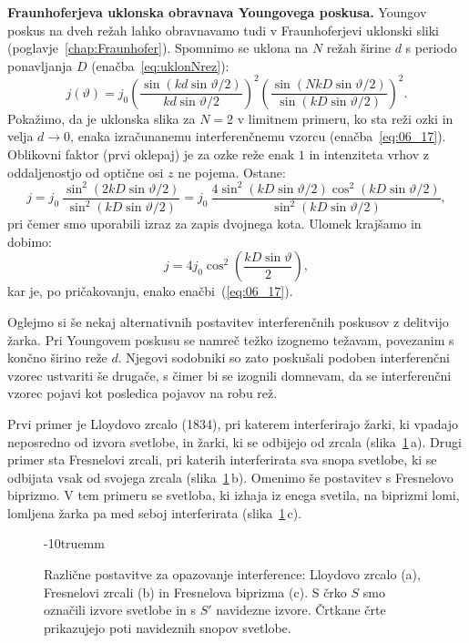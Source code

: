 \begin{example}{\bf Fraunhoferjeva uklonska obravnava Youngovega 
poskusa.}
Youngov poskus na dveh režah lahko obravnavamo tudi v Fraunhoferjevi uklonski
sliki (poglavje~\ref{chap:Fraunhofer}). Spomnimo se uklona na $N$ režah
širine $d$ s periodo ponavljanja $D$ (enačba~\ref{eq:uklonNrez}):
\begin{equation}
j(\vartheta) = j_0 \left(\frac{\sin\left(kd\sin\vartheta/2\right)}{kd\sin\vartheta/2}\right)^2
\left(\frac{\sin\left(NkD\sin\vartheta/2\right)}{\sin\left(kD\sin\vartheta/2\right)}\right)^2\!\!.
\label{eq:06_22}
\end{equation}
Pokažimo, da je uklonska slika za $N=2$ v limitnem primeru, ko sta
reži ozki in velja $d\to 0$, enaka izračunanemu interferenčnemu vzorcu 
(enačba~\ref{eq:06_17}). Oblikovni faktor (prvi oklepaj) je za ozke reže 
enak $1$ in intenziteta vrhov z oddaljenostjo od optične osi $z$ ne pojema. Ostane:
\begin{equation}
j = j_0~\frac{\sin^2(2kD\sin\vartheta/2)}{\sin^2(kD\sin\vartheta/2)} = 
j_0~\frac{4 \sin^2(kD\sin\vartheta/2)\cos^2(kD \sin\vartheta/2)}{\sin^2(kD \sin\vartheta/2)},
\end{equation}
pri čemer smo uporabili izraz za zapis dvojnega kota. Ulomek krajšamo in dobimo:
\begin{equation}
j = 4j_0 \cos^2\left(\frac{kD \sin\vartheta}{2}\right)\!\!,
\label{eq:06_23}
\end{equation}
kar je, po pričakovanju, enako enačbi~(\ref{eq:06_17}).
\end{example}

\begin{remark}
Oglejmo si še nekaj alternativnih postavitev interferenčnih poskusov
z delitvijo žarka. Pri Youngovem poskusu se namreč težko izognemo 
težavam, povezanim s končno širino reže $d$. Njegovi
sodobniki so zato poskušali podoben interferenčni vzorec ustvariti 
še drugače, s čimer bi se izognili domnevam, da se interferenčni 
vzorec pojavi kot posledica pojavov na robu rež. 

Prvi primer je Lloydovo zrcalo (1834), pri katerem interferirajo žarki, 
ki vpadajo neposredno od izvora svetlobe, in žarki, ki se odbijejo od zrcala
(slika~\ref{fig:06_Lloyd}\,a).
Drugi primer sta Fresnelovi zrcali, pri katerih interferirata
sva snopa svetlobe, ki se odbijata vsak od svojega zrcala 
(slika~\ref{fig:06_Lloyd}\,b). Omenimo še postavitev s Fresnelovo biprizmo.
V tem primeru se svetloba, ki izhaja iz enega svetila, 
na biprizmi lomi, lomljena žarka pa med seboj 
interferirata (slika~\ref{fig:06_Lloyd}\,c).

\begin{figure}[ht]
\centering
\def\svgwidth{140truemm} 

\caption{Različne postavitve za opazovanje interference: Lloydovo zrcalo (a), Fresnelovi
zrcali (b) in Fresnelova biprizma (c). S črko $S$ smo označili izvore svetlobe in s  
$S'$ navidezne izvore. Črtkane črte prikazujejo poti navideznih snopov svetlobe.}
\label{fig:06_Lloyd}
\vglue-10truemm
\end{figure}
\end{remark}

